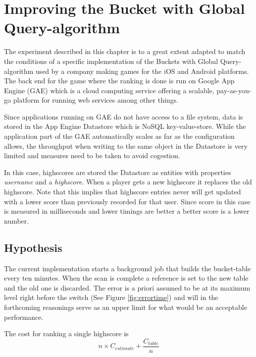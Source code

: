 \chapter{\label{method}Improving the Bucket with Global\\Query-algorithm}

The experiment described in this chapter is to a great extent adapted to match the conditions of a specific implementation of the Buckets with Global Query-algorithm used by a company making games for the iOS and Android platforms. The back end for the game where the ranking is done is run on Google App Engine (GAE) which is a cloud computing service offering a scalable, pay-as-you-go platform for running web services among other things.

Since applications running on GAE do not have access to a file system, data is stored in the App Engine Datastore which is NoSQL key-value-store. While the application part of the GAE  automatically scales as far as the configuration allows, the throughput when writing to the same object in the Datastore is very limited and measures need to be taken to avoid cogestion.

In this case, highscores are stored the Datastore as entities with properties \emph{username} and a \emph{highscore}. When a player gets a new highscore it replaces the old highscore. Note that this implies that highscore entries never will get updated with a lower score than previously recorded for that user. Since score in this case is measured in milliseconds and lower timings are better a better score is a lower number.

\section{Hypothesis} 

The current implementation starts a background job that builds the bucket-table every ten minutes. When the scan is complete a reference is set to the new table and the old one is discarded. The error is a priori assumed to be at its maximum level right before the switch (See Figure \ref{fig:errortime}) and will in the forthcoming reasonings serve as an upper limit for what would be an acceptable performance.

The cost for ranking a single highscore is 
\begin{equation}
  n \times C_{estimate} + \frac{ C_{table}}{n}
\end{equation}


